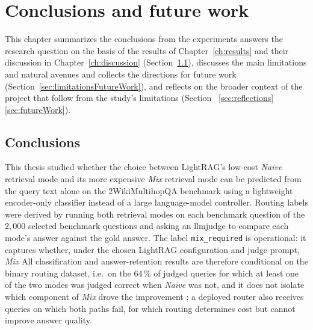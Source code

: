 \documentclass[english, bibtex]{kththesis}               %
\numberwithin{listing}{chapter}
\providecommand{\DIFaddtex}[1]{{\protect\color{blue} \sf #1}} %
\providecommand{\DIFdeltex}[1]{{\protect\color{red} \scriptsize #1}} %
\providecommand{\DIFaddbegin}{} %
\providecommand{\DIFaddend}{} %
\providecommand{\DIFdelbegin}{} %
\providecommand{\DIFdelend}{} %
\providecommand{\DIFadd}[1]{\texorpdfstring{\DIFaddtex{#1}}{#1}} %
\providecommand{\DIFdel}[1]{\texorpdfstring{\DIFdeltex{#1}}{}} %
\begin{document}
\DIFaddend \cleardoublepage
\chapter{Conclusions and future work}
\label{ch:conclusionsAndFutureWork}

This chapter \DIFdelbegin \DIFdel{summarizes the conclusions from the experiments }\DIFdelend \DIFaddbegin \DIFadd{answers the research question on the basis of the results of Chapter~\ref{ch:results} and their discussion in Chapter~\ref{ch:discussion} }\DIFaddend (Section~\ref{sec:conclusions}), \DIFdelbegin \DIFdel{discusses the main limitations and natural avenues }\DIFdelend \DIFaddbegin \DIFadd{and collects the directions }\DIFaddend for future work \DIFdelbegin \DIFdel{(Section~\ref{sec:limitationsFutureWork}), and reflects on the broader context of the project }\DIFdelend \DIFaddbegin \DIFadd{that follow from the study's limitations }\DIFaddend (Section~\DIFdelbegin \DIFdel{\ref{sec:reflections}}\DIFdelend \DIFaddbegin \DIFadd{\ref{sec:futureWork}}\DIFaddend ).

\section{Conclusions}
\label{sec:conclusions}

This thesis studied whether the choice between LightRAG's low-cost \emph{Naive} retrieval mode and its more expensive \emph{Mix} retrieval mode can be predicted from the query text alone on the 2WikiMultihopQA benchmark using a lightweight encoder-only classifier instead of a large language-model controller. Routing labels were derived by running both retrieval modes on each \DIFdelbegin \DIFdel{benchmark question }\DIFdelend \DIFaddbegin \DIFadd{of the $2{,}000$ selected benchmark questions }\DIFaddend and asking an \gls{llmjudge} \cite{zheng2023judge} to compare each mode's answer against the gold answer. \DIFdelbegin \DIFdel{The label \texttt{mix\_required} is operational: it captures whether, under the chosen LightRAG configuration and judge prompt, \emph{Mix} }\DIFdelend \DIFaddbegin \DIFadd{All classification and answer-retention results are therefore conditional on the binary routing dataset, i.e.\ on the $64\,\%$ of judged queries for which at least one of the two modes }\DIFaddend was judged correct\DIFdelbegin \DIFdel{when \emph{Naive} was not, and it does not isolate which component of \emph{Mix} drove the improvement}\DIFdelend \DIFaddbegin \DIFadd{; a deployed router also receives queries on which both paths fail, for which routing determines cost but cannot improve answer quality}\DIFaddend .
\end{document}
